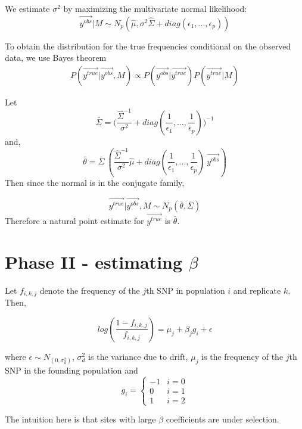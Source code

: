 \documentclass[10pt,a4paper,draft]{article}
\begin{document}
We estimate $\sigma^2$ by maximizing the multivariate normal likelihood:
\begin{equation}
 \vec{y^{obs}}|M \sim N_p(\hat{\mu}, \sigma^2\hat{\Sigma} + diag(\epsilon_1,...,\epsilon_p))
\end{equation}

To obtain the distribution for the true frequencies conditional on the observed data, we use Bayes theorem 
\begin{align*}
P(\vec{y^{true}} | \vec{y^{obs}}, M) \propto P(\vec{y^{obs}} | \vec{y^{true}}) P(\vec{y^{true}}|M)
\end{align*}

Let
\begin{equation}
\bar{\Sigma} = \big(\frac{\hat{\Sigma}^{-1}}{\sigma^2} + diag(\frac{1}{\epsilon_1},..., \frac{1}{\epsilon_p})\big)^{-1}
\end{equation}
and,
\begin{equation}
\bar{\theta} = \bar{\Sigma} \ (\frac{\hat{\Sigma}^{-1}}{\sigma^2}\hat{\mu} + diag(\frac{1}{\epsilon_1},..., \frac{1}{\epsilon_p}) \ \vec{y^{obs}})
\end{equation}
Then since the normal is in the conjugate family,

\begin{equation}
\vec{y^{true}} | \vec{y^{obs}}, M \sim N_p(\bar{\theta}, \bar{\Sigma})
\end{equation}
Therefore a natural point estimate for $\vec{y^{true}}$ is $\bar{\theta}$.

\section{Phase II - estimating $\beta$}
Let $f_{i,k,j}$ denote the frequency of the $j$th SNP in population $i$ and replicate $k$. Then,

\begin{equation}
log(\frac{1-f_{i,k,j}}{f_{i,k,j}}) = \mu_j + \beta_{j} g_i + \epsilon
\end{equation}

where $\epsilon \sim N_(0, \sigma_d^2)$, $\sigma_d^2$ is the variance due to drift, $\mu_j$ is the frequency of the $j$th SNP in the founding population and 
\[
   g_{i} = \left\{
     \begin{array}{lr}
       -1 &  i =0\\
        0 &  i =1 \\
        1 &  i =2
     \end{array}
   \right.
\]

The intuition here is that sites with large $\beta$ coefficients are under selection.
\end{document}
